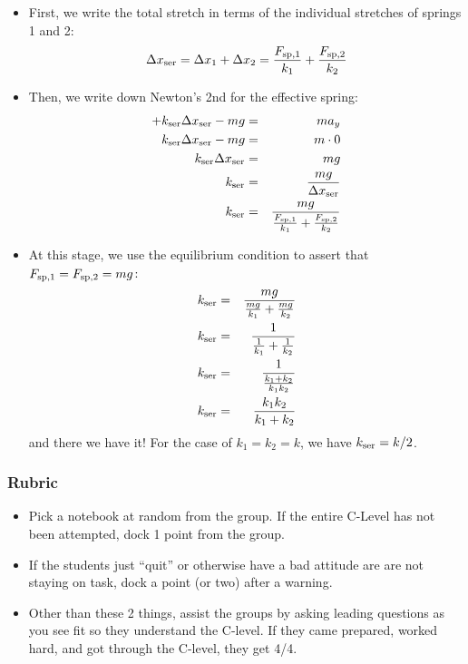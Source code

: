 \documentclass[fleqn,letterpaper]{article}
\begin{document}
\begin{itemize}
  \item{First, we write the total stretch in terms of the individual stretches of springs 1 and 2:
   \begin{equation}
    \Delta x_{\rm ser} = \Delta x_1 + \Delta x_2 = \frac{F_{{\rm sp},1}}{k_1} + \frac{F_{{\rm sp},2}}{k_2}
   \end{equation}
}
\item{Then, we write down Newton's 2nd for the effective spring:
   \begin{eqnarray}
       +k_{\rm ser} \Delta x_{\rm ser} - mg & = & m a_y \\
    k_{\rm ser} \Delta x_{\rm ser} - mg & = & m \cdot 0 \\
      k_{\rm ser} \Delta x_{\rm ser} & = & m g \\
    k_{\rm ser}  & = & \frac{m g}{\Delta x_{\rm ser}} \\
    k_{\rm ser}  & = & \frac{m g}{\frac{F_{{\rm sp},1}}{k_1} + \frac{F_{{\rm sp},2}}{k_2}}
  \end{eqnarray}
}
 \item{At this stage, we use the equilibrium condition to assert that $F_{{\rm sp},1} = F_{{\rm sp},2} = mg$:
   \begin{eqnarray}
     k_{\rm ser}  & = & \frac{m g}{\frac{mg}{k_1} + \frac{mg}{k_2}} \\
     k_{\rm ser}  & = & \frac{1}{\frac{1}{k_1} + \frac{1}{k_2}} \\
     k_{\rm ser}  & = & \frac{1}{\frac{k_1 + k_2}{k_1 k_2}} \\
     k_{\rm ser}  & = & \frac{k_1 k_2}{k_1 + k_2}
   \end{eqnarray}
   and there we have it!  For the case of $k_1 = k_2 = k$, we have $k_{\rm ser} = k/2$.
}
\end{itemize}


\subsubsection*{Rubric}

\begin{itemize}
 \item{Pick a notebook at random from the group.  If the entire C-Level has not been attempted, dock 1 point from the group.}
 \item{If the students just ``quit'' or otherwise have a bad attitude are are not staying on task, dock a point (or two) after a warning.}
 \item{Other than these 2 things, assist the groups by asking leading questions as you see fit so they understand the C-level.  If they came prepared, worked hard, and got through the C-level, they get 4/4.}
\end{itemize}
\end{document}
